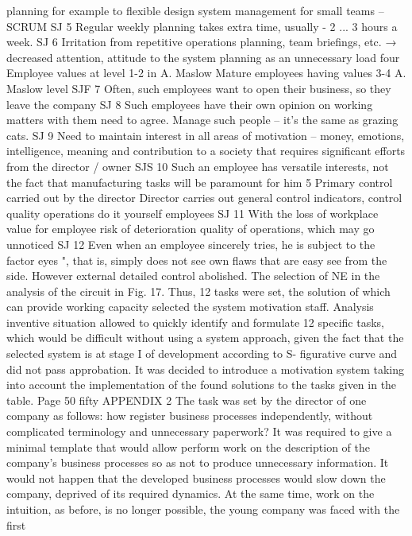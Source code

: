 planning
for example to flexible
design system
management for small
teams -- SCRUM
SJ 5
Regular weekly planning
takes extra time, usually -
2 ... 3 hours a week.
SJ 6
Irritation from repetitive operations
planning, team briefings, etc. →
decreased attention, attitude to the system
planning as an unnecessary load
four
Employee values
at level 1-2 in A.
Maslow
Mature employees
having values ​​3-4
A. Maslow level
SJF 7
Often, such employees want to open their
business, so they leave the company
SJ 8
Such employees have their own
opinion on working matters with them
need to agree. Manage such
people -- it’s the same as grazing cats.
SJ 9
Need to maintain interest in
all areas of motivation -- money,
emotions, intelligence, meaning and contribution to
a society that requires significant
efforts from the director / owner
SJS 10
Such an employee has versatile
interests, not the fact that manufacturing
tasks will be paramount for him
5
Primary control
carried out by the director
Director carries out
general control
indicators, control
quality operations
do it yourself
employees
SJ 11
With the loss of workplace value for
employee risk of deterioration
quality of operations, which
may go unnoticed
SJ 12
Even when an employee sincerely tries,
he is subject to the factor
eyes ", that is, simply does not see
own flaws that are easy
see from the side. However external
detailed control abolished.
The selection of NE in the analysis of the circuit in Fig. 17.
Thus, 12 tasks were set, the solution of which can provide
working capacity
selected
the system
motivation
staff.
Analysis
inventive situation allowed to quickly identify and formulate 12
specific tasks, which would be difficult without using a system
approach, given the fact that the selected system is at stage I of development according to S-
figurative curve and did not pass approbation.
It was decided to introduce a motivation system taking into account the implementation of the found
solutions to the tasks given in the table.
Page 50
fifty
APPENDIX 2
The task was set by the director of one company as follows: how
register business processes independently, without complicated terminology and unnecessary
paperwork? It was required to give a minimal template that would allow
perform work on the description of the company's business processes so as not to produce
unnecessary information. It would not happen that the developed business processes
would slow down the company, deprived of its required dynamics. At the same time, work on
the intuition, as before, is no longer possible, the young company was faced with the first
